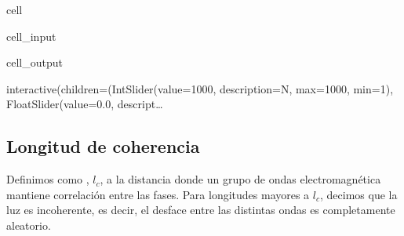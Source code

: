 \documentclass[letterpaper,10pt,english]{jupyterBook}
\begin{document}
\begin{sphinxuseclass}{cell}\begin{sphinxVerbatimInput}

\begin{sphinxuseclass}{cell_input}
\begin{sphinxVerbatim}[commandchars=\\\{\}]
   

  
   
     
\end{sphinxVerbatim}

\end{sphinxuseclass}\end{sphinxVerbatimInput}
\begin{sphinxVerbatimOutput}

\begin{sphinxuseclass}{cell_output}
\begin{sphinxVerbatim}[commandchars=\\\{\}]
interactive(children=(IntSlider(value=1000, description=\PYGZsq{}N\PYGZsq{}, max=1000, min=1), FloatSlider(value=0.0, descript…
\end{sphinxVerbatim}

\end{sphinxuseclass}\end{sphinxVerbatimOutput}

\end{sphinxuseclass}

\subsection{Longitud de coherencia}
\label{\detokenize{5_TransporteRadiativo/5_TransporteRadiativo:longitud-de-coherencia}}
\sphinxAtStartPar
Definimos como , \(l_c\), a la distancia donde un grupo de ondas electromagnética mantiene correlación entre las fases. Para longitudes mayores a \(l_c\), decimos que la luz es incoherente, es decir, el desface entre las distintas ondas es completamente aleatorio.
\end{document}
